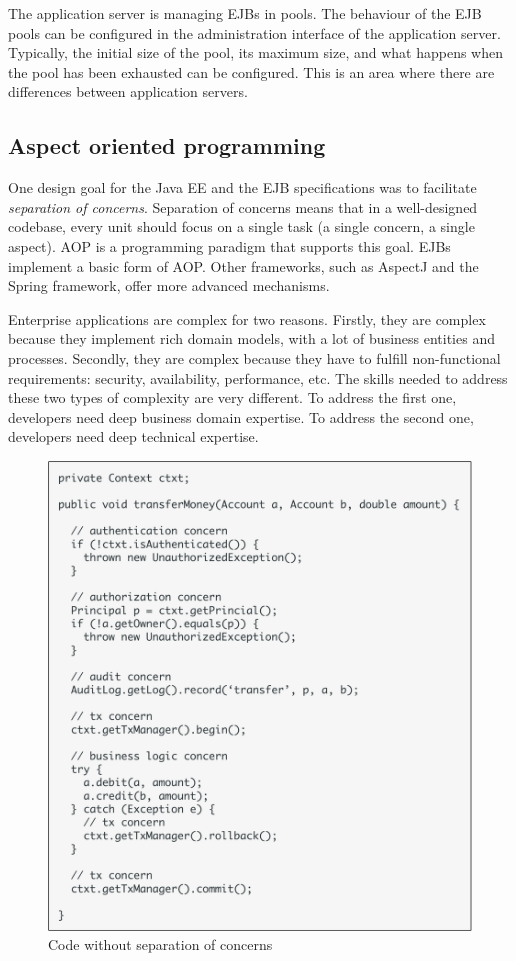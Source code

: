 The application server is managing \ac{EJB}s in pools. The behaviour of the EJB pools can be configured in the administration interface of the application server. Typically, the initial size of the pool, its maximum size, and what happens when the pool has been exhausted can be configured. This is an area where there are differences between application servers.

\subsection{Aspect oriented programming}


One design goal for the \ac{Java EE} and the \ac{EJB} specifications was to facilitate \emph{separation of concerns}. Separation of concerns means that in a well-designed codebase, every unit should focus on a single task (a single concern, a single aspect). \ac{AOP} is a programming paradigm that supports this goal. \ac{EJB}s implement a basic form of \ac{AOP}. Other frameworks, such as AspectJ and the Spring framework, offer more advanced mechanisms.

Enterprise applications are complex for two reasons. Firstly, they are complex because they implement rich domain models, with a lot of business entities and processes. Secondly, they are complex because they have to fulfill non-functional requirements: security, availability, performance, etc. The skills needed to address these two types of complexity are very different. To address the first one, developers need deep business domain expertise. To address the second one, developers need deep technical expertise.

\begin{figure}[]
	\centering
    \includegraphics[width=0.8\linewidth]{Figures/aop-code-without.pdf}
	\caption{Code without separation of concerns}
  \label{fig:aop-without}
\end{figure}

